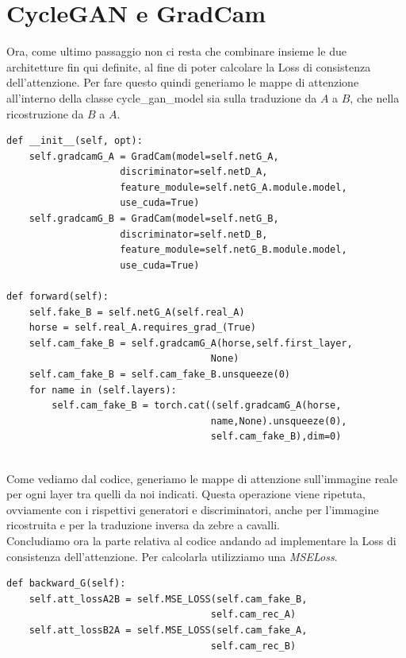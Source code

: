 \section{CycleGAN e GradCam}
Ora, come ultimo passaggio non ci resta che combinare insieme le due architetture fin qui definite, al fine di poter calcolare la Loss di consistenza dell'attenzione. Per fare questo quindi generiamo le mappe di attenzione all'interno della classe cycle\_gan\_model sia sulla traduzione da $A$ a $B$, che nella ricostruzione da $B$ a $A$. 
\begin{verbatim}
def __init__(self, opt):
    self.gradcamG_A = GradCam(model=self.netG_A,
                    discriminator=self.netD_A,
                    feature_module=self.netG_A.module.model,
                    use_cuda=True)
    self.gradcamG_B = GradCam(model=self.netG_B,
                    discriminator=self.netD_B,
                    feature_module=self.netG_B.module.model,
                    use_cuda=True)
    
def forward(self):
    self.fake_B = self.netG_A(self.real_A)
    horse = self.real_A.requires_grad_(True)   
    self.cam_fake_B = self.gradcamG_A(horse,self.first_layer,
                                    None)
    self.cam_fake_B = self.cam_fake_B.unsqueeze(0)
    for name in (self.layers):
        self.cam_fake_B = torch.cat((self.gradcamG_A(horse,
                                    name,None).unsqueeze(0),
                                    self.cam_fake_B),dim=0)
    
\end{verbatim}
Come vediamo dal codice, generiamo le mappe di attenzione sull'immagine reale per ogni layer tra quelli da noi indicati. Questa operazione viene ripetuta, ovviamente con i rispettivi generatori e discriminatori, anche per l'immagine ricostruita e per la traduzione inversa da zebre a cavalli.
\\Concludiamo ora la parte relativa al codice andando ad implementare la Loss di consistenza dell'attenzione. Per calcolarla utilizziamo una \emph{MSELoss}.
\begin{verbatim}
def backward_G(self):
    self.att_lossA2B = self.MSE_LOSS(self.cam_fake_B,
                                    self.cam_rec_A)
    self.att_lossB2A = self.MSE_LOSS(self.cam_fake_A,
                                    self.cam_rec_B)
\end{verbatim}
